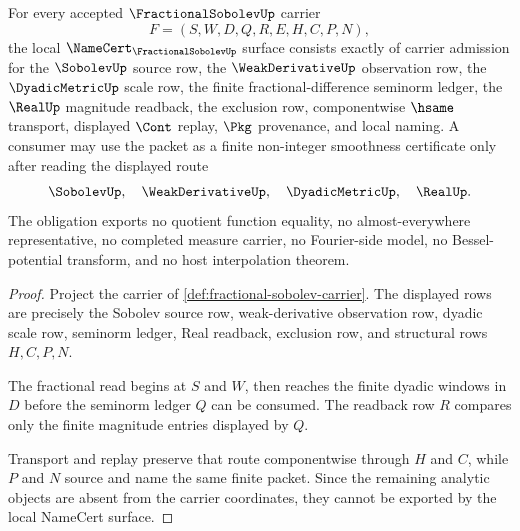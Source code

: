 \begin{theorem}
\label{thm:fractional-sobolev-namecert-obligation}
For every accepted $\FractionalSobolevUp$ carrier
$$
F=(S,W,D,Q,R,E,H,C,P,N),
$$
the local $\NameCert_{\FractionalSobolevUp}$ surface consists exactly of carrier admission for the $\SobolevUp$ source row, the $\WeakDerivativeUp$ observation row, the $\DyadicMetricUp$ scale row, the finite fractional-difference seminorm ledger, the $\RealUp$ magnitude readback, the exclusion row, componentwise $\hsame$ transport, displayed $\Cont$ replay, $\Pkg$ provenance, and local naming. A consumer may use the packet as a finite non-integer smoothness certificate only after reading the displayed route
$$
\SobolevUp,\quad \WeakDerivativeUp,\quad \DyadicMetricUp,\quad \RealUp .
$$
The obligation exports no quotient function equality, no almost-everywhere representative, no completed measure carrier, no Fourier-side model, no Bessel-potential transform, and no host interpolation theorem.
\end{theorem}
\begin{proof}
Project the carrier of \autoref{def:fractional-sobolev-carrier}. The displayed rows are precisely the Sobolev source row, weak-derivative observation row, dyadic scale row, seminorm ledger, Real readback, exclusion row, and structural rows $H,C,P,N$.

The fractional read begins at $S$ and $W$, then reaches the finite dyadic windows in $D$ before the seminorm ledger $Q$ can be consumed. The readback row $R$ compares only the finite magnitude entries displayed by $Q$.

Transport and replay preserve that route componentwise through $H$ and $C$, while $P$ and $N$ source and name the same finite packet. Since the remaining analytic objects are absent from the carrier coordinates, they cannot be exported by the local NameCert surface.
\end{proof}



